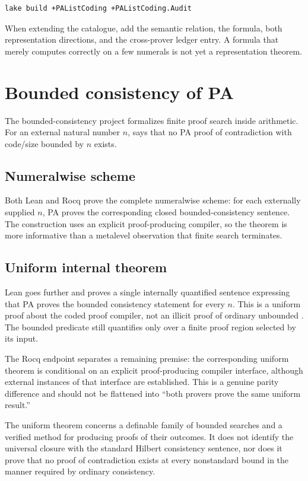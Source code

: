 \documentclass[
  10pt,
  a4paper,
  twoside,
  open=any,
  parskip=half,
  headings=big
]{scrreprt}
\newcommand{\code}[1]{\texttt{\detokenize{#1}}}
\begin{document}
\begin{lstlisting}[language=bash]
lake build +PAListCoding +PAListCoding.Audit
\end{lstlisting}

When extending the catalogue, add the semantic relation, the formula, both representation directions, and the cross-prover ledger entry. A formula that merely computes correctly on a few numerals is not yet a representation theorem.

\section{Bounded consistency of PA}
\label{sec:bounded-pa}

The bounded-consistency project formalizes finite proof search inside arithmetic. For an external natural number $n$, \code{Con_n(PA)} says that no PA proof of contradiction with code/size bounded by $n$ exists.

\subsection{Numeralwise scheme}

Both Lean and Rocq prove the complete numeralwise scheme: for each externally supplied $n$, PA proves the corresponding closed bounded-consistency sentence. The construction uses an explicit proof-producing compiler, so the theorem is more informative than a metalevel observation that finite search terminates.

\subsection{Uniform internal theorem}

Lean goes further and proves a single internally quantified sentence expressing that PA proves the bounded consistency statement for every $n$. This is a uniform proof about the coded proof compiler, not an illicit proof of ordinary unbounded \code{Con(PA)}. The bounded predicate still quantifies only over a finite proof region selected by its input.

The Rocq endpoint separates a remaining premise: the corresponding uniform theorem is conditional on an explicit proof-producing compiler interface, although external instances of that interface are established. This is a genuine parity difference and should not be flattened into ``both provers prove the same uniform result.''

\begin{boundarybox}
The uniform theorem concerns a definable family of bounded searches and a verified method for producing proofs of their outcomes. It does not identify the universal closure with the standard Hilbert consistency sentence, nor does it prove that no proof of contradiction exists at every nonstandard bound in the manner required by ordinary consistency.
\end{boundarybox}
\end{document}

